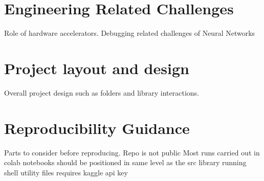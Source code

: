 \section{Engineering Related Challenges}
Role of hardware accelerators. Debugging related challenges of Neural Networks

\section{Project layout and design}
Overall project design such as folders and library interactions.

\section{Reproducibility Guidance}
Parts to consider before reproducing.
Repo is not public
Most runs carried out in colab 
notebooks should be positioned in same level as the src library
running shell utility files requires kaggle api key


\clearpage